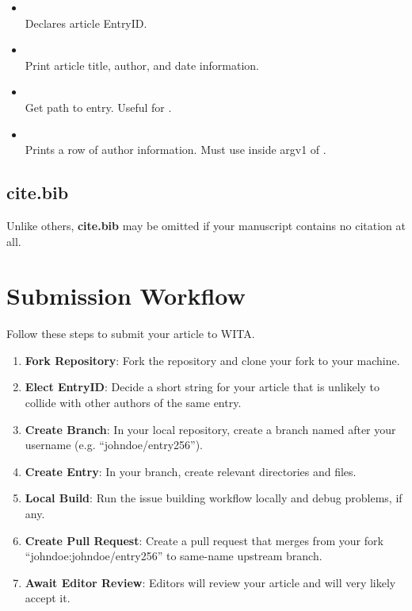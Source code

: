 \begin{itemize}
	\raggedright
	\item \texttt{}\\
	      Declares article EntryID.

	\item \texttt{}\\
	      Print article title, author, and date information.

	\item \texttt{}\\
	      Get path to entry. Useful for \texttt{}.

	\item \texttt{}\\
	      Prints a row of author information. Must use inside argv1 of \texttt{}.

\end{itemize}

\subsection{cite.bib}
Unlike others, \textbf{cite.bib} may be omitted if your manuscript contains no citation at all.




\section{Submission Workflow}
Follow these steps to submit your article to WITA.

\begin{enumerate}
	\item \textbf{Fork Repository}: Fork the repository and clone your fork to your machine.
	\item \textbf{Elect EntryID}: Decide a short string for your article that is unlikely to collide with other authors of the same entry.
	\item \textbf{Create Branch}: In your local repository, create a branch named after your username (e.g. ``johndoe/entry256'').
	\item \textbf{Create Entry}: In your branch, create relevant directories and files.
	\item \textbf{Local Build}: Run the issue building workflow locally and debug problems, if any.
	\item \textbf{Create Pull Request}: Create a pull request that merges from your fork ``johndoe:johndoe/entry256'' to same-name upstream branch.
	\item \textbf{Await Editor Review}: Editors will review your article and will very likely accept it.
\end{enumerate}

